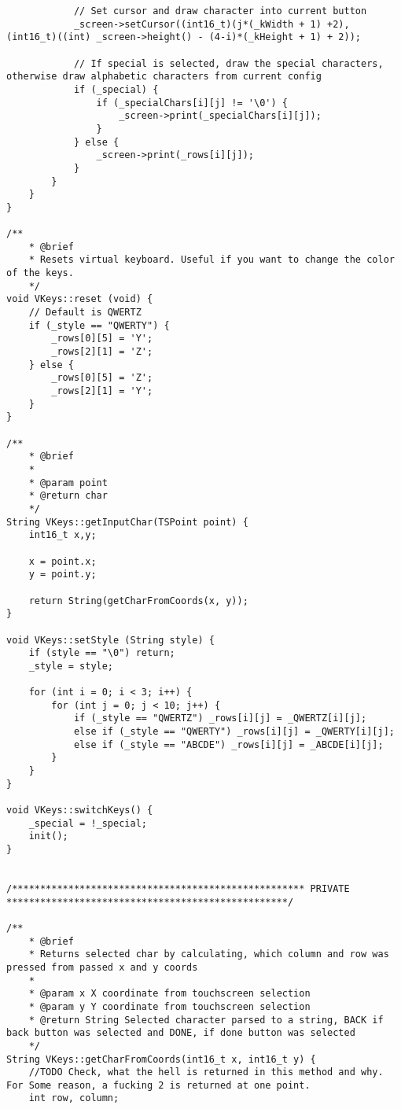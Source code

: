 \documentclass[a4paper, 11pt]{scrartcl}
\begin{document}
\begin{lstlisting}
            // Set cursor and draw character into current button
            _screen->setCursor((int16_t)(j*(_kWidth + 1) +2), (int16_t)((int) _screen->height() - (4-i)*(_kHeight + 1) + 2));
            
            // If special is selected, draw the special characters, otherwise draw alphabetic characters from current config
            if (_special) {
                if (_specialChars[i][j] != '\0') {
                    _screen->print(_specialChars[i][j]);
                }
            } else {
                _screen->print(_rows[i][j]);
            }
        }
    }
}

/**
    * @brief 
    * Resets virtual keyboard. Useful if you want to change the color of the keys.
    */
void VKeys::reset (void) {
    // Default is QWERTZ
    if (_style == "QWERTY") {
        _rows[0][5] = 'Y';
        _rows[2][1] = 'Z';
    } else {
        _rows[0][5] = 'Z';
        _rows[2][1] = 'Y';
    }
}

/**
    * @brief 
    * 
    * @param point 
    * @return char 
    */
String VKeys::getInputChar(TSPoint point) {
    int16_t x,y;

    x = point.x;
    y = point.y;

    return String(getCharFromCoords(x, y));
}

void VKeys::setStyle (String style) { 
    if (style == "\0") return; 
    _style = style;

    for (int i = 0; i < 3; i++) {
        for (int j = 0; j < 10; j++) {
            if (_style == "QWERTZ") _rows[i][j] = _QWERTZ[i][j];
            else if (_style == "QWERTY") _rows[i][j] = _QWERTY[i][j];
            else if (_style == "ABCDE") _rows[i][j] = _ABCDE[i][j];
        }
    }
}

void VKeys::switchKeys() {
    _special = !_special;
    init();
}


/**************************************************** PRIVATE **************************************************/

/**
    * @brief 
    * Returns selected char by calculating, which column and row was pressed from passed x and y coords
    * 
    * @param x X coordinate from touchscreen selection
    * @param y Y coordinate from touchscreen selection
    * @return String Selected character parsed to a string, BACK if back button was selected and DONE, if done button was selected
    */
String VKeys::getCharFromCoords(int16_t x, int16_t y) {
    //TODO Check, what the hell is returned in this method and why. For Some reason, a fucking 2 is returned at one point.
    int row, column;


\end{lstlisting}
\end{document}
